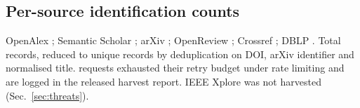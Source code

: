 \documentclass[journal]{IEEEtran}
\begin{document}
\subsection*{Per-source identification counts}
OpenAlex \SrcOpenAlex{}; Semantic Scholar \SrcSemanticScholar{};
arXiv \SrcarXiv{}; OpenReview \SrcOpenReview{}; Crossref \SrcCrossref{};
DBLP \SrcDBLP{}. Total \CorpusRaw{} records, reduced to \CorpusDedup{}
unique records by deduplication on DOI, arXiv identifier and normalised
title. \FailedRequests{} requests exhausted their retry budget under rate
limiting and are logged in the released harvest report. IEEE Xplore was not
harvested (Sec.~\ref{sec:threats}).



\end{document}
